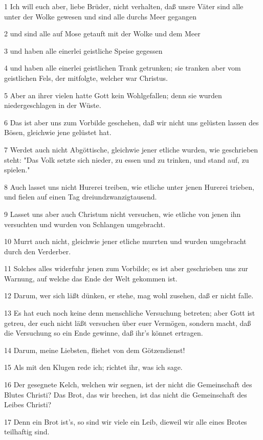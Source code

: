 \par 1 Ich will euch aber, liebe Brüder, nicht verhalten, daß unsre Väter sind alle unter der Wolke gewesen und sind alle durchs Meer gegangen
\par 2 und sind alle auf Mose getauft mit der Wolke und dem Meer
\par 3 und haben alle einerlei geistliche Speise gegessen
\par 4 und haben alle einerlei geistlichen Trank getrunken; sie tranken aber vom geistlichen Fels, der mitfolgte, welcher war Christus.
\par 5 Aber an ihrer vielen hatte Gott kein Wohlgefallen; denn sie wurden niedergeschlagen in der Wüste.
\par 6 Das ist aber uns zum Vorbilde geschehen, daß wir nicht uns gelüsten lassen des Bösen, gleichwie jene gelüstet hat.
\par 7 Werdet auch nicht Abgöttische, gleichwie jener etliche wurden, wie geschrieben steht: "Das Volk setzte sich nieder, zu essen und zu trinken, und stand auf, zu spielen."
\par 8 Auch lasset uns nicht Hurerei treiben, wie etliche unter jenen Hurerei trieben, und fielen auf einen Tag dreiundzwanzigtausend.
\par 9 Lasset uns aber auch Christum nicht versuchen, wie etliche von jenen ihn versuchten und wurden von Schlangen umgebracht.
\par 10 Murrt auch nicht, gleichwie jener etliche murrten und wurden umgebracht durch den Verderber.
\par 11 Solches alles widerfuhr jenen zum Vorbilde; es ist aber geschrieben uns zur Warnung, auf welche das Ende der Welt gekommen ist.
\par 12 Darum, wer sich läßt dünken, er stehe, mag wohl zusehen, daß er nicht falle.
\par 13 Es hat euch noch keine denn menschliche Versuchung betreten; aber Gott ist getreu, der euch nicht läßt versuchen über euer Vermögen, sondern macht, daß die Versuchung so ein Ende gewinne, daß ihr's könnet ertragen.
\par 14 Darum, meine Liebsten, fliehet von dem Götzendienst!
\par 15 Als mit den Klugen rede ich; richtet ihr, was ich sage.
\par 16 Der gesegnete Kelch, welchen wir segnen, ist der nicht die Gemeinschaft des Blutes Christi? Das Brot, das wir brechen, ist das nicht die Gemeinschaft des Leibes Christi?
\par 17 Denn ein Brot ist's, so sind wir viele ein Leib, dieweil wir alle eines Brotes teilhaftig sind.
